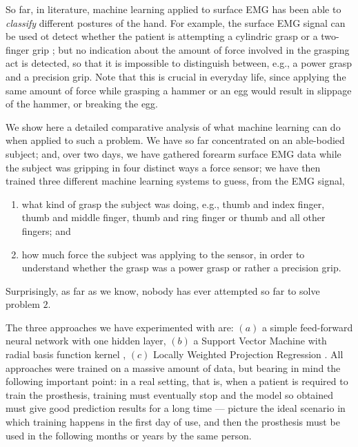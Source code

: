 So far, in literature, machine learning applied to surface EMG has
been able to \emph{classify} different postures of the hand. For
example, the surface EMG signal can be used ot detect whether the
patient is attempting a cylindric grasp or a two-finger grip
\cite{...}; but no indication about the amount of force involved in
the grasping act is detected, so that it is impossible to distinguish
between, e.g., a power grasp and a precision grip. Note that this is
crucial in everyday life, since applying the same amount of force
while grasping a hammer or an egg would result in slippage of the
hammer, or breaking the egg.

We show here a detailed comparative analysis of what machine learning
can do when applied to such a problem. We have so far concentrated on
an able-bodied subject; and, over two days, we have gathered forearm
surface EMG data while the subject was gripping in four distinct ways
a force sensor; we have then trained three different machine learning
systems to guess, from the EMG signal,

\begin{enumerate}

  \item what kind of grasp the subject was doing, e.g., thumb and index
    finger, thumb and middle finger, thumb and ring finger or thumb
    and all other fingers; and

  \item how much force the subject was applying to the sensor, in
    order to understand whether the grasp was a power grasp or rather
    a precision grip.

\end{enumerate}

Surprisingly, as far as we know, nobody has ever attempted so far to
solve problem $2$.

The three approaches we have experimented with are: $(a)$ a simple
feed-forward neural network with one hidden layer, $(b)$ a Support
Vector Machine with radial basis function kernel \cite{BGV92}, $(c)$
Locally Weighted Projection Regression \cite{...}. All approaches were
trained on a massive amount of data, but bearing in mind the following
important point: in a real setting, that is, when a patient is
required to train the prosthesis, training must eventually stop and
the model so obtained must give good prediction results for a long
time --- picture the ideal scenario in which training happens in the
first day of use, and then the prosthesis must be used in the
following months or years by the same person.

